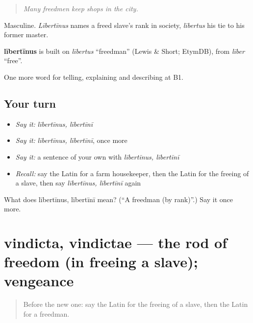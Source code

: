 \begin{quote}
\emph{Many freedmen keep shops in the city.}
\end{quote}

Masculine. \emph{Lībertīnus} names a freed slave's rank in society, \emph{lībertus} his tie to his former master.

\begin{cousinweb}
\textbf{lībertīnus} is built on \emph{lībertus} \textquotedblleft{}freedman\textquotedblright{} (Lewis \& Short; EtymDB), from \emph{līber} \textquotedblleft{}free\textquotedblright{}.
\end{cousinweb}

\begin{grammarlens}[title={What you've built}]
One more word for telling, explaining and describing at B1.
\end{grammarlens}

\subsection*{Your turn}
\begin{itemize}
\raggedright
  \item \emph{Say it:} \emph{lībertīnus, lībertīnī}
  \item \emph{Say it:} \emph{lībertīnus, lībertīnī}, once more
  \item \emph{Say it:} a sentence of your own with \emph{lībertīnus, lībertīnī}
  \item \emph{Recall:} say the Latin for a farm housekeeper, then the Latin for the freeing of a slave, then say \emph{lībertīnus, lībertīnī} again
\end{itemize}

\begin{tcolorbox}[breakable,colback=teal!4,colframe=teal!35!black,title={Before you move on}]
What does lībertīnus, lībertīnī mean? (\textquotedblleft{}A freedman (by rank)\textquotedblright{}.) Say it once more.
\end{tcolorbox}
\section[vindicta, vindictae]{vindicta, vindictae — the rod of freedom (in freeing a slave); vengeance}

\label{lesson:LA-C532-vindicta}



\begin{quote}
Before the new one: say the Latin for the freeing of a slave, then the Latin for a freedman.
\end{quote}

